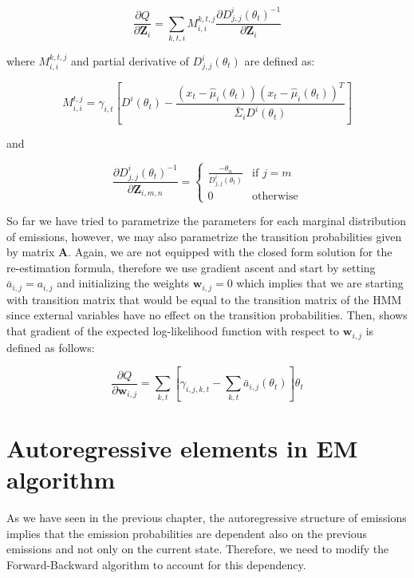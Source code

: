 \begin{equation}
    \frac{\partial Q}{\partial \textbf{Z}_i} = \sum_{k,t,i} M_{i,i}^{k,t,j} \frac{\partial D_{j,j}^i(\theta_t)^{-1}}{\partial \textbf{Z}_i}
\end{equation}

where $M_{i,i}^{k,t,j}$ and partial derivative of $D_{j,j}^i(\theta_t)$ are defined as:

\begin{equation}
    M_{i,i}^{t,j} = \gamma_{i,t} \left[ D^i(\theta_t) - \frac{(x_t - \hat{\mu}_i(\theta_t))(x_t - \hat{\mu}_i(\theta_t))^T}{\bar{\Sigma}_i D^i(\theta_t)} \right]
\end{equation}

and 

\begin{equation}
    \frac{\partial D_{j,j}^i(\theta_t)^{-1}}{\partial \textbf{Z}_{i,m,n}} =
    \begin{cases} 
        \frac{-\theta_n}{D_{j,j}^i(\theta_t)} & \text{if } j = m \\
        0 & \text{otherwise}
    \end{cases}
\end{equation}

So far we have tried to parametrize the parameters for each marginal distribution of emissions, however, we may also parametrize the transition probabilities
given by matrix $\textbf{A}$. Again, we are not equipped with the closed form solution for the re-estimation formula, therefore we use gradient ascent and start by setting $\bar{a}_{i,j} = a_{i,j}$
and initializing the weights $\textbf{w}_{i,j}=0$ which implies that we are starting with transition matrix that would be equal to the transition matrix of the HMM since 
external variables have no effect on the transition probabilities. Then, \citep{Radenen2014} shows that gradient of the expected log-likelihood function with respect to
$\textbf{w}_{i,j}$ is defined as follows:

\begin{equation}
    \frac{\partial Q}{\partial \textbf{w}_{i,j}} = \sum_{k,t} \left[\gamma_{i,j,k,t} - \sum_{k,t} \bar{a}_{i,j}(\theta_t) \right] \theta_t
\end{equation}

\section{Autoregressive elements in EM algorithm}

As we have seen in the previous chapter, the autoregressive structure of emissions implies that the emission probabilities are dependent also on the previous emissions and not only 
on the current state. Therefore, we need to modify the Forward-Backward algorithm to account for this dependency. \citep{Xuan2004}

